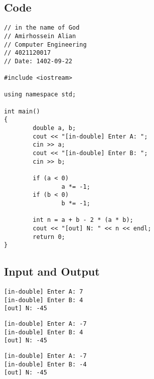 \documentclass[12pt]{article}
\begin{document}
        \subsection{Code}
   \begin{tcolorbox}[breakable, size=fbox, boxrule=1pt, pad at break*=1mm, colback=cellbackground, colframe=cellborder]
\begin{verbatim}
// in the name of God
// Amirhossein Alian
// Computer Engineering
// 4021120017
// Date: 1402-09-22

#include <iostream>

using namespace std;

int main()
{
        double a, b;
        cout << "[in-double] Enter A: ";
        cin >> a;
        cout << "[in-double] Enter B: ";
        cin >> b;

        if (a < 0)
                a *= -1;
        if (b < 0)
                b *= -1;

        int n = a + b - 2 * (a * b);
        cout << "[out] N: " << n << endl;
        return 0;
}

\end{verbatim}
\end{tcolorbox}

	\subsection{Input and Output}

    \begin{tcolorbox}[breakable, size=fbox, boxrule=1pt, pad at break*=1mm, colback=cellbackground!5!white, colframe=gray!75!black, title=Test Case 1]
\begin{Verbatim}[commandchars=\\\{\}]
[in-double] Enter A: 7
[in-double] Enter B: 4
[out] N: -45
\end{Verbatim}
\end{tcolorbox}


    \begin{tcolorbox}[breakable, size=fbox, boxrule=1pt, pad at break*=1mm, colback=cellbackground!5!white, colframe=gray!75!black, title=Test Case 2]
\begin{Verbatim}[commandchars=\\\{\}]
[in-double] Enter A: -7 
[in-double] Enter B: 4
[out] N: -45
\end{Verbatim}
\end{tcolorbox}


    \begin{tcolorbox}[breakable, size=fbox, boxrule=1pt, pad at break*=1mm, colback=cellbackground!5!white, colframe=gray!75!black, title=Test Case 3]
\begin{Verbatim}[commandchars=\\\{\}]
[in-double] Enter A: -7
[in-double] Enter B: -4
[out] N: -45
\end{Verbatim}
\end{tcolorbox}
\end{document}

